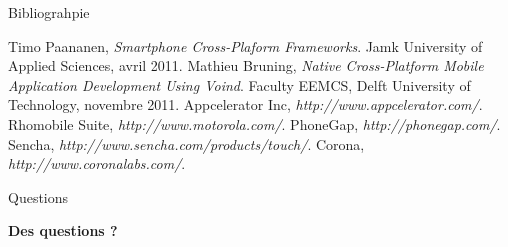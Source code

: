 \documentclass{beamer}
\begin{document}
\begin{frame}{Bibliograhpie}
\begin{thebibliography}{9}
          Timo Paananen,
          \emph{Smartphone Cross-Plaform Frameworks}.
          Jamk University of Applied Sciences,
          avril 2011.
          Mathieu Bruning,
          \emph{Native Cross-Platform Mobile Application Development Using Voind}.
          Faculty EEMCS, Delft University of Technology,
          novembre 2011.
          Appcelerator Inc,
          \emph{http://www.appcelerator.com/}.
          Rhomobile Suite,
          \emph{http://www.motorola.com/}.
          PhoneGap,
          \emph{http://phonegap.com/}.
          Sencha,
          \emph{http://www.sencha.com/products/touch/}.
          Corona,
          \emph{http://www.coronalabs.com/}.
\end{thebibliography}
\end{frame}

\begin{frame}{Questions}
\begin{center}
  \textbf{Des questions ?}
\end{center}
\end{frame}
\end{document}
